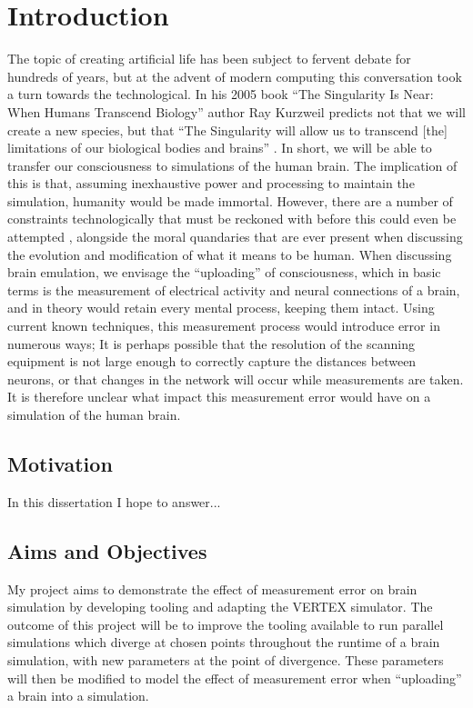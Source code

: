 \chapter{Introduction}

The topic of creating artificial life has been subject to fervent debate for
hundreds of years, but at the advent of modern computing this conversation took
a turn towards the technological. In his 2005 book “The Singularity Is Near:
When Humans Transcend Biology” author Ray Kurzweil predicts not that we will
create a new species, but that “The Singularity will allow us to transcend [the]
limitations of our biological bodies and brains”
\parencite{kurzweil_singularity_2006}.
In short, we will be able to transfer our
consciousness to simulations of the human brain. The implication of this is
that, assuming inexhaustive power and processing to maintain the simulation,
humanity would be made immortal. However, there are a number of constraints
technologically that must be reckoned with before this could even be attempted
\parencite{bostrom_whole_2008}, alongside the moral quandaries that are ever
present when discussing the evolution and modification of what it means to be
human. When discussing brain emulation, we envisage the “uploading” of
consciousness, which in basic terms is the measurement of electrical activity
and neural connections of a brain, and in theory would retain every mental
process, keeping them intact. Using current known techniques, this
measurement process would introduce error in numerous ways; It is perhaps
possible that the resolution of the scanning equipment is not large enough to
correctly capture the distances between neurons, or that changes in the network
will occur while measurements are taken. It is therefore unclear what impact
this measurement error would have on a simulation of the human brain.

\section{Motivation}

In this dissertation I hope to answer...

\section{Aims and Objectives}

My project aims to demonstrate the effect of measurement error on brain
simulation by developing tooling and adapting the VERTEX simulator. The outcome
of this project will be to improve the tooling available to run parallel
simulations which diverge at chosen points throughout the runtime of a brain
simulation, with new parameters at the point of divergence. These parameters
will then be modified to model the effect of measurement error when “uploading”
a brain into a simulation.

